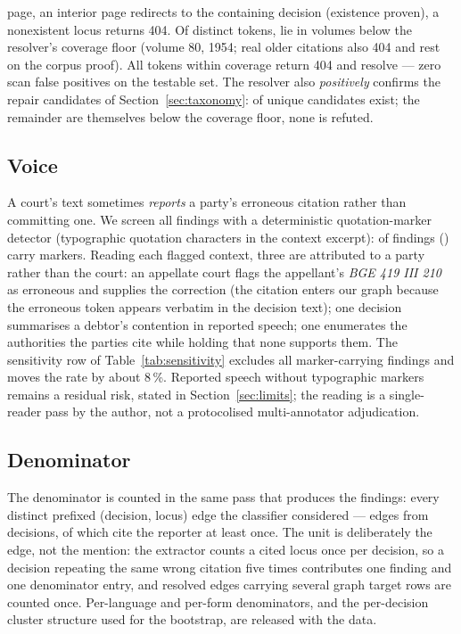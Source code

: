 \documentclass[11pt,a4paper]{article}
\begin{document}
\begin{itemize}
      page, an interior page redirects to the containing decision
      (existence proven), a nonexistent locus returns 404. Of
      \NProbeTokens{} distinct tokens, \NProbeOOC{} lie in volumes
      below the resolver's coverage floor (volume 80, 1954; real older
      citations also 404 and rest on the corpus proof). All
      \NProbeConfirmed{} tokens within coverage return 404 and
      \NProbeExists{} resolve --- zero scan false positives on the
      testable set. The resolver also \emph{positively} confirms the
      repair candidates of Section~\ref{sec:taxonomy}:
      \NProbeCandExist{} of \NProbeCand{} unique candidates exist; the
      remainder are themselves below the coverage floor, none is
      refuted.
\end{itemize}

\subsection{Voice}\label{sec:voice}

A court's text sometimes \emph{reports} a party's erroneous citation
rather than committing one. We screen all findings with a deterministic
quotation-marker detector (typographic quotation characters in the
context excerpt): \NQuoteMarker{} of \NFindings{} findings
(\QuoteShare) carry markers. Reading each flagged context, three are
attributed to a party rather than the court: an appellate court flags
the appellant's \emph{BGE 419 III 210} as erroneous and supplies the
correction (the citation enters our graph because the erroneous token
appears verbatim in the decision text); one decision summarises a
debtor's contention in reported speech; one enumerates the
authorities the parties cite while holding that none supports them.
The sensitivity row of Table~\ref{tab:sensitivity} excludes all
\NQuoteMarker{} marker-carrying findings and moves the rate by about
8\,\%. Reported speech without typographic markers remains a residual
risk, stated in Section~\ref{sec:limits}; the reading is a
single-reader pass by the author, not a protocolised multi-annotator
adjudication.

\subsection{Denominator}\label{sec:denominator}

The denominator is counted in the same pass that produces the
findings: every distinct prefixed (decision, locus) edge the classifier
considered --- \NDenomTokens{} edges from \NWindowDecisions{}
decisions, of which \NDecTok{} cite the reporter at least once. The
unit is deliberately the edge, not the mention: the extractor counts a
cited locus once per decision, so a decision repeating the same wrong
citation five times contributes one finding and one denominator entry,
and resolved edges carrying several graph target rows are counted
once. Per-language and per-form denominators, and the per-decision
cluster structure used for the bootstrap, are released with the data.
\end{document}
